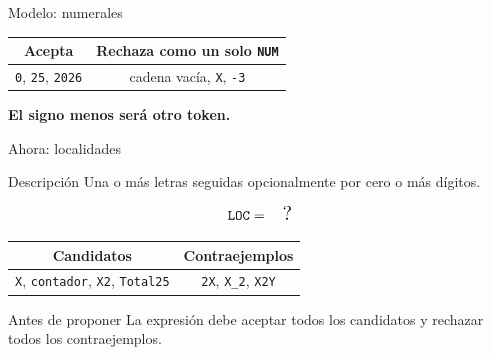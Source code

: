 \documentclass[11pt,spanish]{beamer}
\newcommand{\term}[1]{\textbf{\textcolor{indiagreen!80!black}{#1}}}
\begin{document}
\begin{frame}{Modelo: numerales}
\vfill

\begin{center}
\end{center}

\bigskip

\begin{center}
\small
\begin{tabular}{|c|c|}
\hline
\textbf{Acepta} & \textbf{Rechaza como un solo \texttt{NUM}} \\
\hline
\texttt{0}, \texttt{25}, \texttt{2026} & cadena vacía, \texttt{X}, \texttt{-3} \\
\hline
\end{tabular}
\end{center}

\bigskip

\term{El signo menos será otro token.}

\vfill
\end{frame}

\begin{frame}{Ahora: localidades}
\vfill

\begin{block}{Descripción}
Una o más letras seguidas opcionalmente por cero o más dígitos.
\end{block}

\bigskip

\[
\texttt{LOC} = \quad \text{\Large ?}
\]

\begin{center}
\small
\begin{tabular}{|c|c|}
\hline
\textbf{Candidatos} & \textbf{Contraejemplos} \\
\hline
\texttt{X}, \texttt{contador}, \texttt{X2}, \texttt{Total25}
&
\texttt{2X}, \texttt{X\_2}, \texttt{X2Y}
\\
\hline
\end{tabular}
\end{center}

\bigskip

\begin{alertblock}{Antes de proponer}
La expresión debe aceptar todos los candidatos y rechazar todos los contraejemplos.
\end{alertblock}

\vfill
\end{frame}
\end{document}
